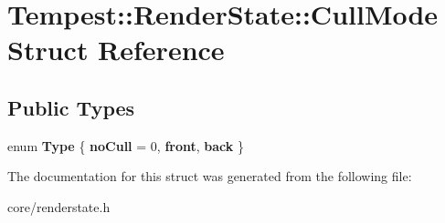 \hypertarget{struct_tempest_1_1_render_state_1_1_cull_mode}{\section{Tempest\+:\+:Render\+State\+:\+:Cull\+Mode Struct Reference}
\label{struct_tempest_1_1_render_state_1_1_cull_mode}
}
\subsection*{Public Types}
\begin{DoxyCompactItemize}
\item 
\hypertarget{struct_tempest_1_1_render_state_1_1_cull_mode_a36b1a0fee8db3093624fe167bd1fceaa}{enum {\bfseries Type} \{ {\bfseries no\+Cull} = 0, 
{\bfseries front}, 
{\bfseries back}
 \}}\label{struct_tempest_1_1_render_state_1_1_cull_mode_a36b1a0fee8db3093624fe167bd1fceaa}

\end{DoxyCompactItemize}


The documentation for this struct was generated from the following file\+:\begin{DoxyCompactItemize}
\item 
core/renderstate.\+h\end{DoxyCompactItemize}
